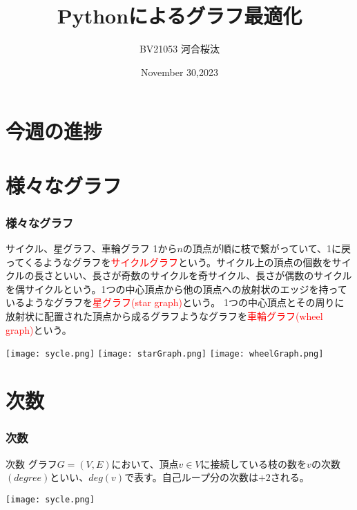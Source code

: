 \documentclass[aspectratio=169, dvipdfmx, 11pt]{beamer} %
\title{Pythonによるグラフ最適化}
\author[Ota Kawai]{BV21053 河合桜汰}
\institute[G-Zhai Lab]{協調制御研究室}
\date{November 30,2023}
\begin{document}
\frame{
\titlepage
}


\section{今週の進捗}
\frame{\tableofcontents[currentsection]} %


\section{様々なグラフ}
\frame{\tableofcontents[currentsection]} %

\begin{frame}
\frametitle{様々なグラフ}%
\begin{block}{サイクル、星グラフ、車輪グラフ}
1から$n$の頂点が順に枝で繋がっていて、1に戻ってくるようなグラフを\textcolor{red}{サイクルグラフ}という。サイクル上の頂点の個数をサイクルの長さといい、長さが奇数のサイクルを奇サイクル、長さが偶数のサイクルを偶サイクルという。1つの中心頂点から他の頂点への放射状のエッジを持っているようなグラフを\textcolor{red}{星グラフ(star graph)}という。
1つの中心頂点とその周りに放射状に配置された頂点から成るグラフようなグラフを\textcolor{red}{車輪グラフ(wheel graph)}という。
\end{block}
\centering
\texttt{[image: sycle.png]}
\texttt{[image: starGraph.png]}
\texttt{[image: wheelGraph.png]}
\end{frame}

\section{次数}
\frame{\tableofcontents[currentsection]} %

\begin{frame}
\frametitle{次数}
\begin{block}{次数}
グラフ$G=(V,E)$において、頂点${v \in V}$に接続している枝の数を$v$の次数$(degree)$といい、$deg(v)$で表す。自己ループ分の次数は$+2$される。
\end{block}
\centering
\texttt{[image: sycle.png]}
\end{frame}
\end{document}
